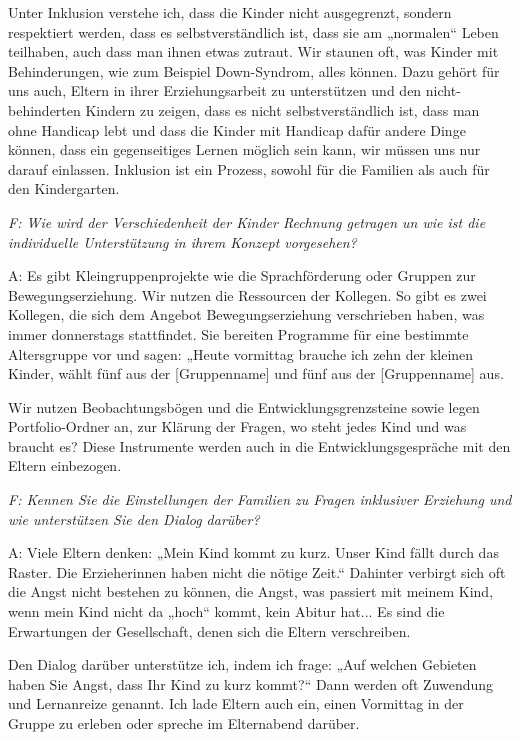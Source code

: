 \begin{linenumbers*}
Unter Inklusion verstehe ich, dass die Kinder nicht ausgegrenzt, sondern respektiert werden, dass es selbstverständlich ist, dass sie am „normalen“ Leben teilhaben, auch dass man ihnen etwas zutraut. Wir staunen oft, was Kinder mit Behinderungen, wie zum Beispiel Down-Syndrom, alles können. 
Dazu gehört für uns auch, Eltern in ihrer Erziehungsarbeit zu unterstützen und den nicht-behinderten Kindern zu zeigen, dass es nicht selbstverständlich ist, dass man ohne Handicap lebt und dass die Kinder mit Handicap dafür andere Dinge können, dass ein gegenseitiges Lernen möglich sein kann, wir müssen uns nur darauf einlassen. Inklusion ist ein Prozess, sowohl für die Familien als auch für den Kindergarten. 

\emph{F: Wie wird der Verschiedenheit der Kinder Rechnung getragen un wie ist die individuelle Unterstützung in ihrem Konzept vorgesehen?}

A: Es gibt Kleingruppenprojekte wie die Sprachförderung oder Gruppen zur Bewegungserziehung.
Wir nutzen die Ressourcen der Kollegen. So gibt es zwei Kollegen, die sich dem Angebot Bewegungserziehung verschrieben haben, was immer donnerstags stattfindet. Sie bereiten Programme für eine bestimmte Altersgruppe vor und sagen: „Heute vormittag brauche ich zehn der kleinen Kinder, wählt fünf aus der [Gruppenname] und fünf aus der [Gruppenname] aus. 
  
Wir nutzen Beobachtungsbögen und die Entwicklungsgrenzsteine sowie legen Portfolio-Ordner an, zur Klärung der Fragen, wo steht jedes Kind und was braucht es? Diese Instrumente werden auch in die Entwicklungsgespräche mit den Eltern einbezogen. 

\emph{F: Kennen Sie die Einstellungen der Familien zu Fragen inklusiver Erziehung und wie unterstützen Sie den Dialog darüber?}

A: Viele Eltern denken: „Mein Kind kommt zu kurz. Unser Kind fällt durch das Raster. Die Erzieherinnen haben nicht die nötige Zeit.“ Dahinter verbirgt sich oft die Angst nicht bestehen zu können, die Angst, was passiert mit meinem Kind, wenn mein Kind nicht da „hoch“ kommt, kein Abitur hat... Es sind die Erwartungen der Gesellschaft, denen sich die Eltern verschreiben.  

Den Dialog darüber unterstütze ich, indem ich frage: „Auf welchen Gebieten haben Sie Angst, dass Ihr Kind zu kurz kommt?“ Dann werden oft Zuwendung und Lernanreize genannt. Ich lade Eltern auch ein, einen Vormittag in der Gruppe zu erleben oder spreche im Elternabend darüber.  


\end{linenumbers*}
